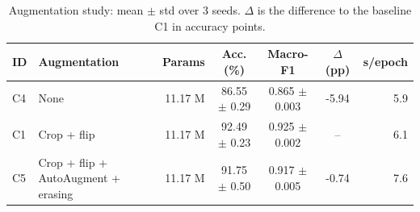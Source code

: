 \begin{table}[t]
\caption{Augmentation study: mean $\pm$ std over 3 seeds. $\Delta$ is the difference to the baseline C1 in accuracy points.}
\label{tab:augmentation}
\begin{tabular}{llrcccr}
\toprule
ID & Augmentation & Params & Acc. (\%) & Macro-F1 & $\Delta$ (pp) & s/epoch \\
\midrule
C4 & None & 11.17 M & 86.55 $\pm$ 0.29 & 0.865 $\pm$ 0.003 & -5.94 & 5.9 \\
C1 & Crop + flip & 11.17 M & 92.49 $\pm$ 0.23 & 0.925 $\pm$ 0.002 & -- & 6.1 \\
C5 & Crop + flip + AutoAugment + erasing & 11.17 M & 91.75 $\pm$ 0.50 & 0.917 $\pm$ 0.005 & -0.74 & 7.6 \\
\bottomrule
\end{tabular}
\end{table}

